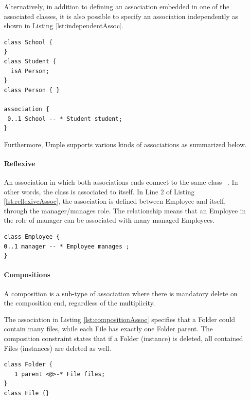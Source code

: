 Alternatively, in addition to defining an association embedded in one of the associated classes, it is also possible to specify an association independently as shown in Listing \ref{lst:independentAssoc}. 

\begin{lstlisting}[style=umplePlain, caption=An example of an independent Umple association,label=lst:independentAssoc]
class School {
}
class Student {
  isA Person;
}
class Person { }

association {
 0..1 School -- * Student student;
}
\end{lstlisting}
Furthermore, Umple supports various kinds of associations as summarized below.
\paragraph{Reflexive}
An association in which both associations ends connect to the same class ~\cite{UMLSpec}. In other words, the class is associated to itself. In Line 2 of Listing \ref{lst:reflexiveAssoc}, the association is defined between Employee and itself, through the manager/manages role. The relationship means that an Employee in the role of manager can be associated with many managed Employees. 

\begin{lstlisting}[style=umplePlainNumbers, caption=A Reflexive association,label=lst:reflexiveAssoc]
class Employee {
0..1 manager -- * Employee manages ;
}
\end{lstlisting}

\paragraph*{Compositions}
A composition \cite{UMLSpec} is a sub-type of association where there is mandatory delete on the composition end, regardless of the multiplicity. 

The association in Listing \ref{lst:compositionAssoc} specifies that a Folder could contain many files, while each File has exactly one Folder parent. The composition constraint states that if a Folder (instance) is deleted, all contained Files (instances) are deleted as well.
\begin{lstlisting}[style=umplePlainNumbers, caption=A Composite association,label=lst:compositionAssoc]
class Folder { 
   1 parent <@>-* File files;
}
class File {}
\end{lstlisting}

